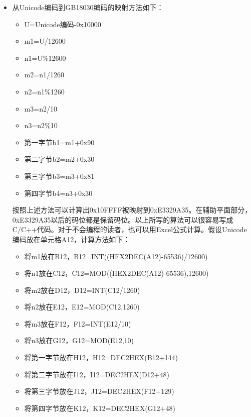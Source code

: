 \documentclass[cn,hazy,blue,14pt,screen]{elegantnote}
\begin{document}
\begin{itemize}

\item
  从Unicode编码到GB18030编码的映射方法如下：\\

  \begin{itemize}
  
  \item
    U=Unicode编码-0x10000
  \item
    m1=U/12600
  \item
    n1=U\%12600
  \item
    m2=n1/1260
  \item
    n2=n1\%1260
  \item
    m3=n2/10
  \item
    n3=n2\%10
  \item
    第一字节b1=m1+0x90
  \item
    第二字节b2=m2+0x30
  \item
    第三字节b3=m3+0x81
  \item
    第四字节b4=n3+0x30
  \end{itemize}

  按照上述方法可以计算出0x10FFFF被映射到0xE3329A35。在辅助平面部分，0xE3329A35以后的码位都是保留码位。以上所写的算法可以很容易写成C/C++代码。对于不会编程的读者，也可以用Excel公式计算。假设Unicode编码放在单元格A12，计算方法如下：\\

  \begin{itemize}
  
  \item
    将m1放在B12，B12=INT((HEX2DEC(A12)-65536)/12600)
  \item
    将n1放在C12，C12=MOD((HEX2DEC(A12)-65536),12600)
  \item
    将m2放在D12，D12=INT(C12/1260)
  \item
    将n2放在E12，E12=MOD(C12,1260)
  \item
    将m3放在F12，F12=INT(E12/10)
  \item
    将n3放在G12，G12=MOD(E12,10)
  \item
    将第一字节放在H12，H12=DEC2HEX(B12+144)
  \item
    将第二字节放在I12，I12=DEC2HEX(D12+48)
  \item
    将第三字节放在J12，J12=DEC2HEX(F12+129)
  \item
    将第四字节放在K12，K12=DEC2HEX(G12+48)
  \end{itemize}


\end{itemize}
\end{document}
